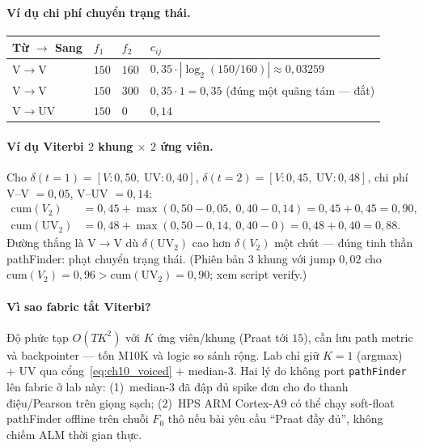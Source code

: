 \paragraph{Ví dụ chi phí chuyển trạng thái.}
\begin{center}\small
\begin{tabular}{@{}llll@{}}\toprule
Từ $\to$ Sang & $f_1$ & $f_2$ & $c_{ij}$ \\
\midrule
V$\to$V & $150$ & $160$ & $0{,}35\cdot|\log_2(150/160)|\approx 0{,}03259$ \\
V$\to$V & $150$ & $300$ & $0{,}35\cdot 1=0{,}35$ (đúng một quãng tám --- đắt) \\
V$\to$UV & $150$ & $0$ & $0{,}14$ \\
\bottomrule
\end{tabular}
\end{center}

\paragraph{Ví dụ Viterbi $2$ khung $\times$ $2$ ứng viên.} Cho $\delta(t{=}1)=[V{:}0{,}50,\ \mathrm{UV}{:}0{,}40]$, $\delta(t{=}2)=[V{:}0{,}45,\ \mathrm{UV}{:}0{,}48]$, chi phí V--V $=0{,}05$, V--UV $=0{,}14$:
\begin{align*}
\mathrm{cum}(V_2)&=0{,}45+\max(0{,}50-0{,}05,\ 0{,}40-0{,}14)=0{,}45+0{,}45=0{,}90,\\
\mathrm{cum}(\mathrm{UV}_2)&=0{,}48+\max(0{,}50-0{,}14,\ 0{,}40-0)=0{,}48+0{,}40=0{,}88.
\end{align*}
Đường thắng là V$\to$V dù $\delta(\mathrm{UV}_2)$ cao hơn $\delta(V_2)$ một chút --- đúng tinh thần pathFinder: phạt chuyển trạng thái. (Phiên bản $3$ khung với jump $0{,}02$ cho $\mathrm{cum}(V_2)=0{,}96>\mathrm{cum}(\mathrm{UV}_2)=0{,}90$; xem script verify.)

\paragraph{Vì sao fabric tắt Viterbi?} Độ phức tạp $O(T K^2)$ với $K$ ứng viên/khung (Praat tới $15$), cần lưu path metric và backpointer --- tốn M10K và logic so sánh rộng. Lab chỉ giữ $K{=}1$ (argmax) + UV qua cổng~\eqref{eq:ch10_voiced} + median-3. Hai lý do không port \texttt{pathFinder} lên fabric ở lab này: (1)~median-3 đã đập đủ spike đơn cho đo thanh điệu/Pearson trên giọng sạch; (2)~HPS ARM Cortex-A9 có thể chạy soft-float pathFinder offline trên chuỗi $F_0$ thô nếu bài yêu cầu ``Praat đầy đủ'', không chiếm ALM thời gian thực.

